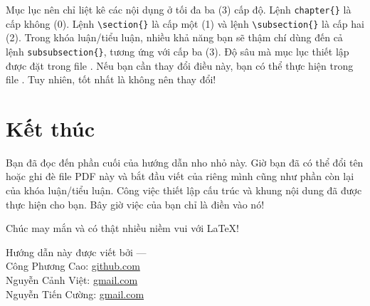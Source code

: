 Mục lục nên chỉ liệt kê các nội dụng ở tối đa ba (3) cấp độ. Lệnh \verb|chapter{}| là cấp không (0). Lệnh \verb|\section{}| là cấp một (1) và lệnh \verb|\subsection{}| là cấp hai (2). Trong khóa luận/tiểu luận, nhiều khả năng bạn sẽ thậm chí dùng đến cả lệnh \verb|subsubsection{}|, tương ứng với cấp ba (3). Độ sâu mà mục lục thiết lập được đặt trong file . Nếu bạn cần thay đổi điều này, bạn có thể thực hiện trong file . Tuy nhiên, tốt nhất là không nên thay đổi!



\section{Kết thúc}

Bạn đã đọc đến phần cuối của hướng dẫn nho nhỏ này. Giờ bạn đã có thể đổi tên hoặc ghi đè file PDF này và bắt đầu viết  của riêng mình cũng như phần còn lại của khóa luận/tiểu luận. Công việc thiết lập cấu trúc và khung nội dung đã được thực hiện cho bạn. Bây giờ việc của bạn chỉ là điền vào nó!

Chúc may mắn và có thật nhiều niềm vui với \LaTeX{}!

\begin{flushright}
Hướng dẫn này được viết bởi ---\\
Công Phương Cao: \href{https://github.com/cpc1996}{github.com}\\
Nguyễn Cảnh Việt: \href{mailto:vietncp@gmail.com}{gmail.com}\\
Nguyễn Tiến Cường: \href{mailto:ngtiencuong@gmail.com}{gmail.com}
\end{flushright}



